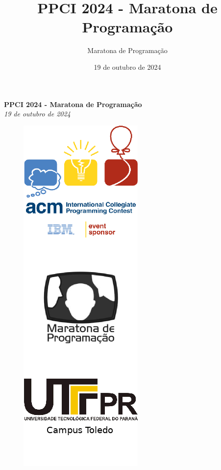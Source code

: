 \documentclass[12pt,oneside]{article} %
\title{PPCI 2024 - Maratona de Programação}
\author{Maratona de Programação}
\date{19 de outubro de 2024}
\begin{document}
\begin{center}
\textbf{\Huge PPCI 2024 - Maratona de Programação} \\
\vspace{0.2cm}
\textit{19 de outubro de 2024} \\
\vspace{1.0cm}
\begin{figure}[h!]
	\centering
 \includegraphics[scale=0.95]{capa.png}
\end{figure}
\vspace{1.0cm}
\vspace{1.0cm}
\end{center}
\end{document}

